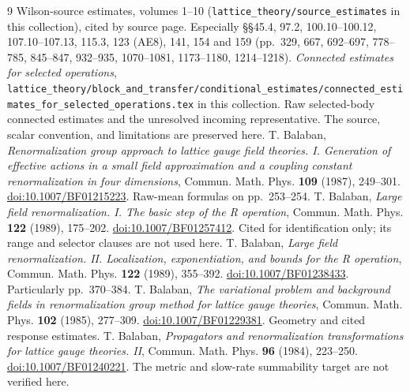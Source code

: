 \documentclass[11pt,letterpaper]{article}
\theoremstyle{plain}
\theoremstyle{remark}\newtheorem{remark}[theorem]{Scope}
\begin{document}
\newpage
\begin{thebibliography}{9}
 Wilson-source estimates, volumes 1--10 (\texttt{lattice\_theory/source\_estimates} in this collection), cited by source page. Especially \S\S45.4, 97.2, 100.10--100.12,
107.10--107.13, 115.3, 123 (AE8), 141, 154 and 159 (pp.~329, 667, 692--697, 778--785, 845--847, 932--935, 1070--1081, 1173--1180, 1214--1218).
 \emph{Connected estimates for selected operations}, \texttt{lattice\_theory/block\_and\_transfer/conditional\_estimates/connected\_estimates\_for\_selected\_operations.tex} in this collection.
Raw selected-body connected estimates and the unresolved incoming
representative. The source, scalar convention, and limitations are
preserved here.
 T. Balaban, \emph{Renormalization group approach to lattice
gauge field theories. I. Generation of effective actions in a small field
approximation and a coupling constant renormalization in four dimensions},
Commun. Math. Phys. \textbf{109} (1987), 249--301.
\href{https://doi.org/10.1007/BF01215223}{doi:10.1007/BF01215223}.
Raw-mean formulas on pp.\ 253--254.
 T. Balaban, \emph{Large field renormalization. I. The basic
step of the R operation}, Commun. Math. Phys. \textbf{122} (1989), 175--202.
\href{https://doi.org/10.1007/BF01257412}{doi:10.1007/BF01257412}.
Cited for identification only; its range and selector
clauses are not used here.
 T. Balaban, \emph{Large field renormalization. II.
Localization, exponentiation, and bounds for the R operation},
Commun. Math. Phys. \textbf{122} (1989), 355--392.
\href{https://doi.org/10.1007/BF01238433}{doi:10.1007/BF01238433}.
Particularly pp.\ 370--384.
 T. Balaban, \emph{The variational problem and background
fields in renormalization group method for lattice gauge theories},
Commun. Math. Phys. \textbf{102} (1985), 277--309.
\href{https://doi.org/10.1007/BF01229381}{doi:10.1007/BF01229381}.
Geometry and cited response estimates.
 T. Balaban, \emph{Propagators and renormalization
transformations for lattice gauge theories. II}, Commun. Math. Phys.
\textbf{96} (1984), 223--250.
\href{https://doi.org/10.1007/BF01240221}{doi:10.1007/BF01240221}.
The metric and slow-rate summability target are not verified here.
\end{thebibliography}
\end{document}
